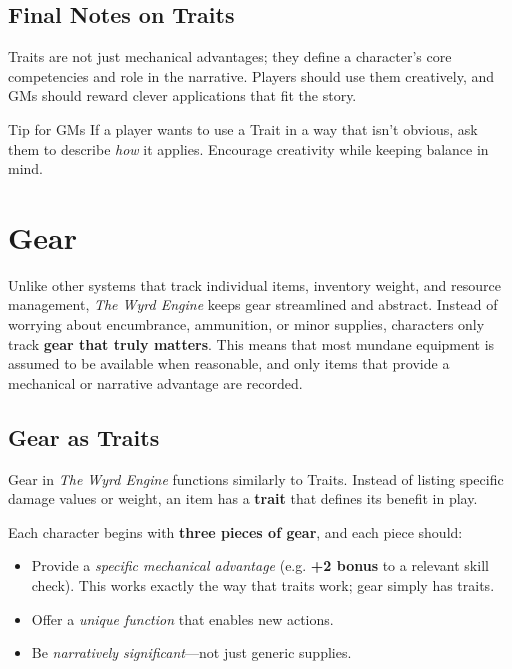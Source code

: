 \subsection{Final Notes on Traits}

Traits are not just mechanical advantages; they define a character’s core competencies and role in the narrative. Players should use them creatively, and GMs should reward clever applications that fit the story.

\begin{DndComment}{Tip for GMs}
 If a player wants to use a Trait in a way that isn’t obvious, ask them to describe \emph{how} it applies. Encourage creativity while keeping balance in mind.
\end{DndComment}

\section{Gear}

Unlike other systems that track individual items, inventory weight, and resource management, \emph{The Wyrd Engine} keeps gear streamlined and abstract. Instead of worrying about encumbrance, ammunition, or minor supplies, characters only track \textbf{gear that truly matters}. This means that most mundane equipment is assumed to be available when reasonable, and only items that provide a mechanical or narrative advantage are recorded.

\subsection{Gear as Traits}
Gear in \emph{The Wyrd Engine} functions similarly to Traits. Instead of listing specific damage values or weight, an item has a \textbf{trait} that defines its benefit in play. 

Each character begins with \textbf{three pieces of gear}, and each piece should:
\begin{itemize}
    \item Provide a \emph{specific mechanical advantage} (e.g. \textbf{+2 bonus} to a relevant skill check). This works exactly the way that traits work; gear simply has traits.
    \item Offer a \emph{unique function} that enables new actions.
    \item Be \emph{narratively significant}—not just generic supplies.
\end{itemize}

